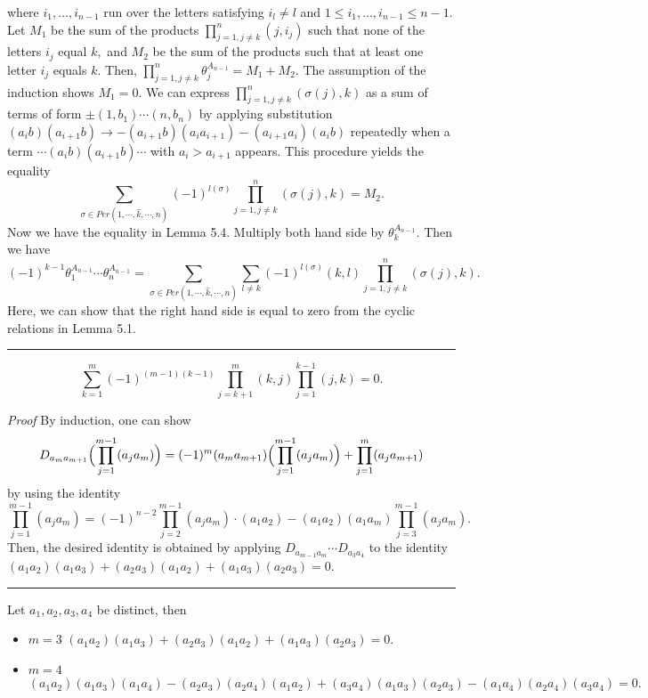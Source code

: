 where $i_1,\ldots ,i_{n-1}$ run over the letters satisfying $i_l\not= l$ and 
$1\leq i_1,\ldots ,i_{n-1} \leq n-1.$ Let 
$M_1$ be the sum of the products $\prod_{j=1, j \ne k}^n (j,i_j)$ such 
that none of the letters $i_j$ equal $k,$ and $M_2$ be the sum of the products 
such that at least one letter $i_j$ equals $k.$ Then, 
$\prod_{j=1, j \ne k}^{n} \theta_j^{A_{n-1}}=M_1+M_2.$ 
The assumption of the induction shows $M_1=0.$ 
We can express $\prod_{j=1, j \ne k}^{n}(\sigma(j),k)$ as a sum of 
terms of form $\pm (1,b_1)\cdots (n, b_n)$ by applying substitution 
$(a_i b)(a_{i+1} b)\rightarrow -(a_{i+1} b)(a_i a_{i+1})-
(a_{i+1}a_i)(a_ib)$ repeatedly 
when a term $\cdots (a_i b)(a_{i+1} b) \cdots$ 
with $a_i>a_{i+1}$ appears. This procedure yields the equality 
\[ \sum_{\sigma 
\in Per(1,\cdots,\widehat k,\cdots,n)} 
(-1)^{l(\sigma)}\prod_{j=1, j \ne k}^{n}(\sigma(j),k) = M_2. \] 
Now we have the equality in Lemma 5.4. Multiply both hand side 
by $\theta_k^{A_{n-1}}.$ Then we have 
\[ (-1)^{k-1} \theta_1^{A_{n-1}}\cdots \theta_n^{A_{n-1}} = 
\sum_{\sigma 
\in Per(1,\cdots,\widehat k,\cdots,n)} \sum_{l\ne k}
(-1)^{l(\sigma)}(k,l) \prod_{j=1, j \ne k}^{n}(\sigma(j),k). \] 
Here, we can show that the right hand side is equal to zero from 
the cyclic relations in Lemma 5.1. \quad \rule{3mm}{3mm} 
\begin{lem}
$$\sum_{k=1}^{m}(-1)^{(m-1)(k-1)}\prod_{j=k+1}^{m}(k,j)
\prod_{j=1}^{k-1}
(j,k)=0.$$
\end{lem}
{\it Proof} \quad By induction, one can show 
\[ D_{a_ma_{m+1}}\Bigl( \prod_{j=1}^{m-1}(a_ja_m) \Bigr) 
= (-1)^m(a_ma_{m+1})\Bigl( \prod_{j=1}^{m-1} (a_j a_m) \Bigr)
+ \prod_{j=1}^m (a_j a_{m+1}) \] 
by using the identity 
\[  \prod_{j=1}^{m-1}(a_ja_m)= (-1)^{n-2} \prod_{j=2}^{m-1}
(a_ja_m)\cdot (a_1a_2) - (a_1a_2)(a_1a_m)\prod_{j=3}^{m-1}
(a_ja_m). \] 
Then, the desired identity is obtained by applying 
$D_{a_{m-1}a_m}\cdots D_{a_3a_4}$ to the identity 
$(a_1a_2)(a_1a_3)+(a_2a_3)(a_1a_2)+(a_1a_3)(a_2a_3)=0.$
\quad \rule{3mm}{3mm}
\begin{ex} {\rm 
Let $a_1,a_2,a_3,a_4$ be distinct, then 
\begin{itemize}
\item $m=3$ \hspace{10mm} 
$(a_1a_2)(a_1a_3)+(a_2a_3)(a_1a_2)+(a_1a_3)(a_2a_3)=0.$ 
\item $m=4$ 
\[ (a_1a_2)(a_1a_3)(a_1a_4)-(a_2a_3)(a_2a_4)(a_1a_2)
+(a_3a_4)(a_1a_3)(a_2a_3)-(a_1a_4)(a_2a_4)(a_3a_4)=0. \]
\end{itemize}}
\end{ex}
